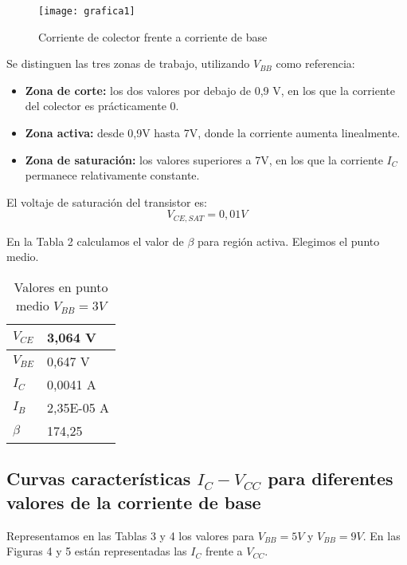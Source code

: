 \documentclass[a4paper,12pt,spanish]{article}
\begin{document}
\begin{figure}[H]
	\centering
	\texttt{[image: grafica1]}
	\caption{Corriente de colector frente a corriente de base}
	\label{fig:grafica1}
\end{figure}


Se distinguen las tres zonas de trabajo, utilizando $V_{BB}$ como referencia:

\begin{itemize}
	\item \textbf{Zona de corte: } los dos valores por debajo de 0,9 V, en los que la corriente del colector es prácticamente 0.
	\item \textbf{Zona activa: } desde 0,9V hasta 7V, donde la corriente aumenta linealmente.
	\item \textbf{Zona de saturación: } los valores superiores a 7V, en los que la corriente $I_C$ permanece relativamente constante.
\end{itemize}




El voltaje de saturación del transistor es:
\[ V_{CE,SAT} = 0,01 \si{V}
\]

En la Tabla 2 calculamos el valor de $\beta$ para región activa. Elegimos el punto medio.

\begin{table}[H]
	\centering
	\begin{tabular}{|l|l|}
		\hline
		$V_{CE}$  & 3,064 V    \\ \hline
		$V_{BE}$  & 0,647 V   \\ \hline
		$I_C$   & 0,0041 A  \\ \hline
		$I_B$   & 2,35E-05 A\\ \hline
		$\beta$ & 174,25   \\ \hline
	\end{tabular}
	\caption{Valores en punto medio $V_{BB} = 3\si{V}$}
	\label{tab:my-table}
\end{table}



\subsection{Curvas características $I_C - V_{CC}$ para diferentes valores de la corriente de base}

Representamos en las Tablas 3 y 4 los valores para $V_{BB} = 5\si{V}$ y $V_{BB} = 9\si{V}$. En las Figuras 4 y 5 están representadas las $I_C$ frente a $V_{CC}$.
\end{document}
